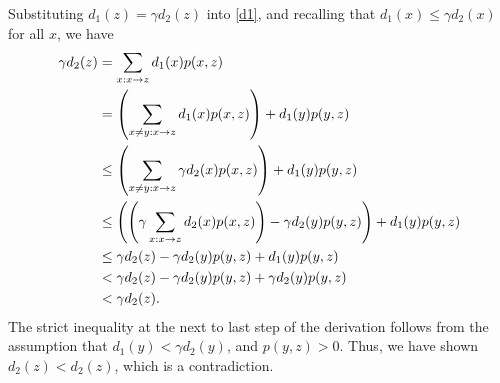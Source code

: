 \documentclass[12pt,twoside]{article}
\begin{document}
\begin{problem}{15}
{  Substituting $d_1(z) = \gamma d_2(z)$ into \eqref{d1}, and recalling
  that $d_1(x) \leq \gamma d_2(x)$ for all $x$, we have
  \begin{align*}
    \gamma d_2(z)
        &= \sum_{x: x\rightarrow z} d_1(x) p(x,z) \\
        &= \left(\sum_{x \neq y: x\rightarrow z}
          d_1(x)p(x,z)\right) + d_1(y) p(y,z) \\
        &\leq \left(\sum_{x \neq y: x\rightarrow z} \gamma d_2(x)
          p(x,z)\right) + d_1(y) p(y,z) \\
        &\leq \left(\left(\gamma \sum_{x: x\rightarrow z} d_2(x)
          p(x,z)\right) - \gamma d_2(y)p(y,z)\right) + d_1(y) p(y,z) \\
        &\leq \gamma d_2(z) - \gamma d_2(y)p(y,z) + d_1(y) p(y,z)\\
        &< \gamma d_2(z) - \gamma d_2(y)p(y,z) + \gamma d_2(y) p(y,z)\\
        &< \gamma d_2(z).
  \end{align*}
  The strict inequality at the next to last step of the derivation
  follows from the assumption that $d_1(y) < \gamma d_2(y)$, and
  $p(y,z) > 0$.  Thus, we have shown $d_2(z) < d_2(z)$, which is a
  contradiction.
}

\eparts

\end{problem}


\end{document}

